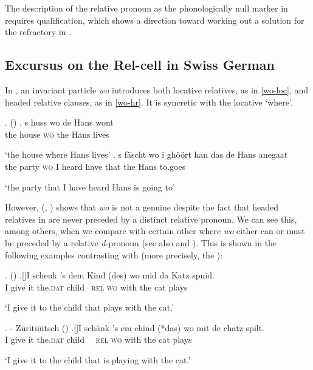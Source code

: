 \noindent The description of the  relative pronoun as the phonologically null marker in  requires qualification, which shows a direction toward working out a solution for the refractory   in .

\subsection{Excursus on the Rel-cell in Swiss German}

In , an invariant particle \textit{wo} introduces both locative relatives, as in \ref{wo-loc}, and headed relative clauses, as in \ref{wo-hr}. It is syncretic with the locative `where'.

\ex.  (\citealt[ex. 42a,b]{vanR2003})
\ag. 
s huss wo de Hans wont\\
the house \textsc{wo} the Hans lives\\
\strut `the house where Hans lives'\label{wo-loc}
\bg.
s f\"ascht wo i gh\"o\"ort han das de Hans anegaat\\
the party \textsc{wo} I heard have that the Hans to.goes\\
\strut `the party that I have heard Hans is going to' \label{wo-hr}

However, \citeauthor{vanR1989} (\citeyear{vanR1989}, \citeyear{vanR2003}) shows that \textit{wo} is not a genuine  despite the fact that headed relatives in  are never preceded by a distinct relative pronoun. We can see this, among others, when we compare  with certain other  where \textit{wo} either can or must be preceded by a relative \textit{d}-pronoun (see also \citealt{Salzmann2006} and \citealt{BB}).
This is shown in the following examples contrasting  with  (more precisely, the ):

\ex.  (\citealt[216]{Bayer1984})
\ag.[]\hspace{-22pt}I schenk 's dem Kind (des) wo mid da Katz spuid.\\
\hspace{-22pt}I give it the.\textsc{dat} child {\ }\textsc{rel} \textsc{wo} with the cat plays\\
\hspace{-22pt}\strut `I give it to the child that plays with the cat.' 


\ex.  - Z\"urit\"u\"utsch (\citealt[4]{vanR2003}) 
\ag.[]\hspace{-22pt}I sch\"ank 's em chind (*das) wo mit de chatz spilt.\\
\hspace{-22pt}I give it the.\textsc{dat} child {\ \ }\textsc{rel} \textsc{wo} with the cat plays\\
\hspace{-22pt}\strut `I give it to the child that is playing with the cat.' 

